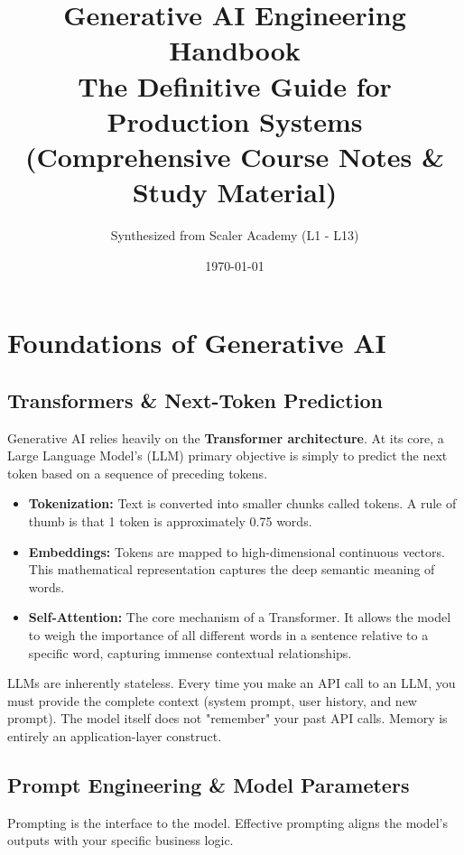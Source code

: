 \documentclass[12pt,a4paper,oneside]{book}
\title{\Huge \textbf{Generative AI Engineering Handbook} \\ \vspace{0.5cm} \Large The Definitive Guide for Production Systems \\ \vspace{0.2cm} \small (Comprehensive Course Notes \& Study Material)}
\author{Synthesized from Scaler Academy (L1 - L13)}
\date{\today}
\begin{document}
\maketitle
\tableofcontents
\newpage

\chapter{Foundations of Generative AI}

\section{Transformers \& Next-Token Prediction}
Generative AI relies heavily on the \textbf{Transformer architecture}. At its core, a Large Language Model's (LLM) primary objective is simply to predict the next token based on a sequence of preceding tokens.
\begin{itemize}
    \item \textbf{Tokenization:} Text is converted into smaller chunks called tokens. A rule of thumb is that 1 token is approximately 0.75 words.
    \item \textbf{Embeddings:} Tokens are mapped to high-dimensional continuous vectors. This mathematical representation captures the deep semantic meaning of words.
    \item \textbf{Self-Attention:} The core mechanism of a Transformer. It allows the model to weigh the importance of all different words in a sentence relative to a specific word, capturing immense contextual relationships.
\end{itemize}

\begin{infobox}
LLMs are inherently stateless. Every time you make an API call to an LLM, you must provide the complete context (system prompt, user history, and new prompt). The model itself does not "remember" your past API calls. Memory is entirely an application-layer construct.
\end{infobox}

\section{Prompt Engineering \& Model Parameters}
Prompting is the interface to the model. Effective prompting aligns the model's outputs with your specific business logic.
\end{document}
